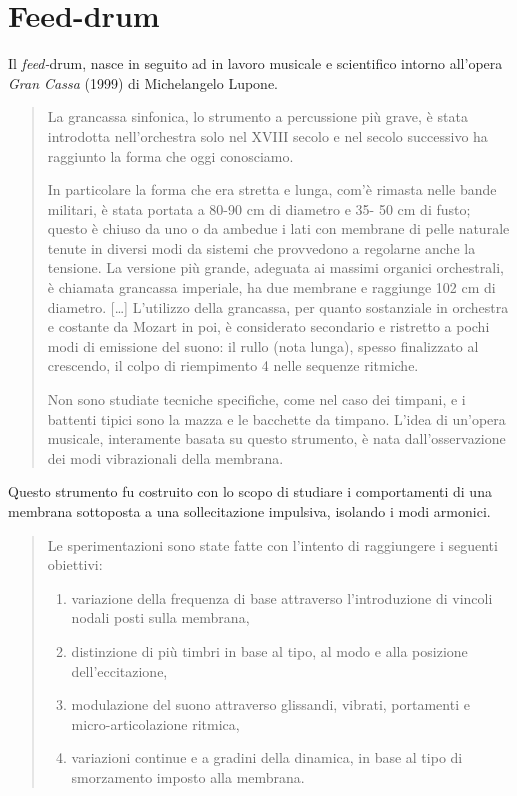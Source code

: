 \section{Feed-drum}

Il \emph{feed-}drum, nasce in seguito ad in lavoro musicale e scientifico
intorno all’opera \emph{Gran Cassa} (1999) di Michelangelo Lupone.

\begin{quote}
La grancassa sinfonica, lo strumento a percussione più grave, è stata introdotta
nell’orchestra solo nel XVIII secolo e nel secolo successivo ha raggiunto la
forma che oggi conosciamo.

In particolare la forma che era stretta e lunga, com’è rimasta nelle bande
militari, è stata portata a 80-90 cm di diametro e 35- 50 cm di fusto; questo
è chiuso da uno o da ambedue i lati con membrane di pelle naturale tenute in
diversi modi da sistemi che provvedono a regolarne anche la tensione.
La versione più grande, adeguata ai massimi organici orchestrali, è chiamata
grancassa imperiale, ha due membrane e raggiunge 102 cm di diametro. [\ldots]
L’utilizzo della grancassa, per quanto sostanziale in orchestra e costante da
Mozart in poi, è considerato secondario e ristretto a pochi modi di emissione
del suono: il rullo (nota lunga), spesso finalizzato al crescendo, il colpo di
riempimento 4 nelle sequenze ritmiche.

Non sono studiate tecniche specifiche, come nel caso dei timpani, e i battenti
tipici sono la mazza e le bacchette da timpano. L’idea di un’opera musicale,
interamente basata su questo strumento, è nata dall’osservazione dei modi
vibrazionali della membrana.
\end{quote}

Questo strumento fu costruito con lo scopo di studiare i comportamenti di una
membrana sottoposta a una sollecitazione impulsiva, isolando i modi armonici.

\begin{quote}
Le sperimentazioni sono state fatte con l’intento di raggiungere i seguenti
obiettivi:

\begin{enumerate}
  \item variazione della frequenza di base attraverso l’introduzione di vincoli
nodali posti sulla membrana,
  \item distinzione di più timbri in base al tipo, al modo e alla posizione
dell’eccitazione,
  \item modulazione del suono attraverso glissandi, vibrati, portamenti e
micro-articolazione ritmica,
  \item variazioni continue e a gradini della dinamica, in base al tipo di
  smorzamento imposto alla membrana.
\end{enumerate}

\end{quote}

